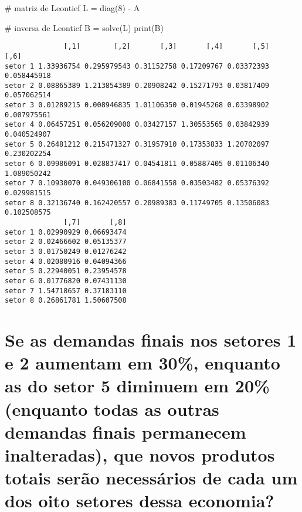 \documentclass[
  letterpaper,
  DIV=11,
  numbers=noendperiod]{scrreprt}
\newenvironment{Shaded}{\begin{snugshade}}{\end{snugshade}}
\newcommand{\CommentTok}[1]{\textcolor[rgb]{0.50,0.62,0.50}{#1}}
\newcommand{\DecValTok}[1]{\textcolor[rgb]{0.86,0.86,0.80}{#1}}
\newcommand{\FunctionTok}[1]{\textcolor[rgb]{0.94,0.94,0.56}{#1}}
\newcommand{\NormalTok}[1]{\textcolor[rgb]{0.80,0.80,0.80}{#1}}
\newcommand{\OtherTok}[1]{\textcolor[rgb]{0.94,0.94,0.56}{#1}}
\newcommand{\SpecialCharTok}[1]{\textcolor[rgb]{0.86,0.64,0.64}{#1}}
\begin{document}
\begin{Shaded}
\begin{Highlighting}[numbers=left,,]
\CommentTok{\# matriz de Leontief}
\NormalTok{L }\OtherTok{=} \FunctionTok{diag}\NormalTok{(}\DecValTok{8}\NormalTok{) }\SpecialCharTok{{-}}\NormalTok{ A}

\CommentTok{\# inversa de Leontief}
\NormalTok{B }\OtherTok{=} \FunctionTok{solve}\NormalTok{(L)}
\FunctionTok{print}\NormalTok{(B)}
\end{Highlighting}
\end{Shaded}

\begin{verbatim}
              [,1]        [,2]       [,3]       [,4]       [,5]        [,6]
setor 1 1.33936754 0.295979543 0.31152758 0.17209767 0.03372393 0.058445918
setor 2 0.08865389 1.213854389 0.20908242 0.15271793 0.03817409 0.057062514
setor 3 0.01289215 0.008946835 1.01106350 0.01945268 0.03398902 0.007975561
setor 4 0.06457251 0.056209000 0.03427157 1.30553565 0.03842939 0.040524907
setor 5 0.26481212 0.215471327 0.31957910 0.17353833 1.20702097 0.230202254
setor 6 0.09986091 0.028837417 0.04541811 0.05887405 0.01106340 1.089050242
setor 7 0.10930070 0.049306100 0.06841558 0.03503482 0.05376392 0.029981515
setor 8 0.32136740 0.162420557 0.20989383 0.11749705 0.13506083 0.102508575
              [,7]       [,8]
setor 1 0.02990929 0.06693474
setor 2 0.02466602 0.05135377
setor 3 0.01750249 0.01276242
setor 4 0.02080916 0.04094366
setor 5 0.22940051 0.23954578
setor 6 0.01776820 0.07431130
setor 7 1.54718657 0.37183110
setor 8 0.26861781 1.50607508
\end{verbatim}

\section{Se as demandas finais nos setores 1 e 2 aumentam em 30\%,
enquanto as do setor 5 diminuem em 20\% (enquanto todas as outras
demandas finais permanecem inalteradas), que novos produtos totais serão
necessários de cada um dos oito setores dessa
economia?}\label{se-as-demandas-finais-nos-setores-1-e-2-aumentam-em-30-enquanto-as-do-setor-5-diminuem-em-20-enquanto-todas-as-outras-demandas-finais-permanecem-inalteradas-que-novos-produtos-totais-seruxe3o-necessuxe1rios-de-cada-um-dos-oito-setores-dessa-economia}
\end{document}
